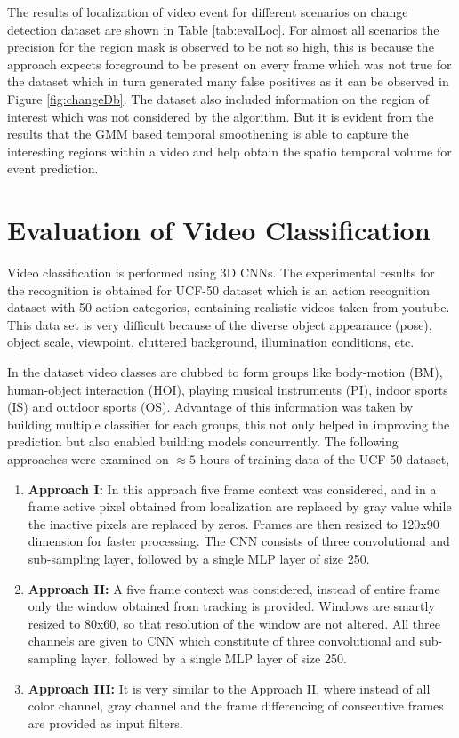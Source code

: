 \par The results of localization of video event for different scenarios on change detection dataset are shown in Table \ref{tab:evalLoc}. For almost all scenarios the precision for the region mask is observed to be not so high, this is because the approach expects foreground to be present on every frame which was not true for the dataset which in turn generated many false positives as it can be observed in Figure \ref{fig:changeDb}.  The dataset also included information on the region of interest which was not considered by the algorithm.  But it is evident from the results that the GMM based temporal smoothening is able to capture the interesting regions within a video and help obtain the spatio temporal volume for event prediction.

\section{Evaluation of Video Classification} 
\label{sec:EvVS}
Video classification is performed using 3D CNNs.  The experimental results for the recognition is obtained for UCF-50 dataset which is an action recognition dataset with 50 action categories,	 containing realistic videos taken from youtube.  This data set is very difficult because of the diverse object appearance (pose), object scale, viewpoint, cluttered background, illumination conditions, etc.  
\par In the dataset video classes are clubbed to form groups like body-motion (BM), human-object interaction (HOI), playing musical instruments (PI), indoor sports (IS) and outdoor sports (OS).   Advantage of this information was taken by building multiple classifier for each groups, this not only helped in improving the prediction but also enabled building models concurrently. The following approaches were examined on $\approx{5}$ hours of training data of the UCF-50 dataset,
\begin{enumerate}
	\item{\textbf{Approach I:} In this approach five frame context was considered, and in a frame active pixel obtained from localization are replaced by gray value while the inactive pixels are replaced by zeros.  Frames are then resized to 120x90 dimension for faster processing.  The CNN consists of three convolutional and sub-sampling layer,  followed by a single MLP layer of size 250.}
	\item{\textbf{Approach II:} A five frame context was considered, instead of entire frame only the window obtained from tracking is provided.  Windows are smartly resized to 80x60, so that resolution of the window are not altered.  All three channels are given to CNN which constitute of three convolutional and sub-sampling layer,  followed by a single MLP layer of size 250.}
	\item{\textbf{Approach III:} It is very similar to the Approach II, where instead of all color channel, gray channel and the frame differencing of consecutive frames are provided as input filters.}	
\end{enumerate}
